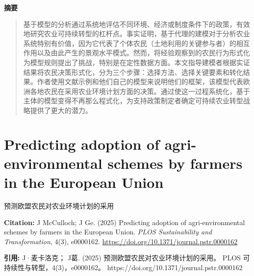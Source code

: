\noindent\textbf{摘要}\par
\begin{quote}\small
基于模型的分析通过系统地评估不同环境、经济或制度条件下的政策，有效地研究农业可持续转型的杠杆点。事实证明，基于代理的建模对于分析农业系统特别有价值，因为它代表了个体农民（土地利用的关键参与者）的相互作用以及由此产生的景观水平模式。然而，将经验观察到的农民行为形式化为模型规则提出了挑战，特别是在定性数据方面。本文指导建模者根据实证结果将农民决策形式化，分为三个步骤：选择方法、选择关键要素和转化结果。作者使用文献示例和他们自己的模型来说明他们的框架，该模型代表欧洲各地农民在采用农业环境计划方面的决策。通过使这一过程系统化，基于主体的模型变得不再那么程式化，为支持政策制定者确定可持续农业转型战略提供了更大的潜力。
\end{quote}

\vspace{0.5em}


\chapter{Predicting adoption of agri-environmental schemes by farmers in the European Union}
\begin{center}\small 预测欧盟农民对农业环境计划的采用\end{center}

\noindent\textbf{Citation:} J McCulloch; J Ge. (2025) Predicting adoption of agri-environmental schemes by farmers in the European Union. \textit{PLOS Sustainability and Transformation}, 4(3), e0000162. \url{https://doi.org/10.1371/journal.pstr.0000162}

\vspace{0.5em}
\noindent\textbf{引用:} J·麦卡洛克； J葛. (2025) 预测欧盟农民对农业环境计划的采用。 PLOS 可持续性与转型，4(3)，e0000162。 https://doi.org/10.1371/journal.pstr.0000162

